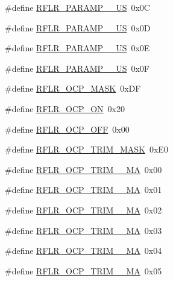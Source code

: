 \begin{DoxyCompactItemize}
\item 
\#define \mbox{\hyperlink{sx1276_regs-_lo_ra_8h_afd5af86b9fcd58b5da08d807ab0deae5}{R\+F\+L\+R\+\_\+\+P\+A\+R\+A\+M\+P\+\_\+\_\+\+US}}~0x0C
\item 
\#define \mbox{\hyperlink{sx1276_regs-_lo_ra_8h_a58992d8a87351616671bb667124c136a}{R\+F\+L\+R\+\_\+\+P\+A\+R\+A\+M\+P\+\_\+\_\+\+US}}~0x0D
\item 
\#define \mbox{\hyperlink{sx1276_regs-_lo_ra_8h_a6af078a4ad16e7e83d180c4470e174e1}{R\+F\+L\+R\+\_\+\+P\+A\+R\+A\+M\+P\+\_\+\_\+\+US}}~0x0E
\item 
\#define \mbox{\hyperlink{sx1276_regs-_lo_ra_8h_a42510cd3823fa579f7ce0a2590414d94}{R\+F\+L\+R\+\_\+\+P\+A\+R\+A\+M\+P\+\_\+\_\+\+US}}~0x0F
\item 
\#define \mbox{\hyperlink{sx1276_regs-_lo_ra_8h_a811d1ea4838fb5bdbc731e246f9abd00}{R\+F\+L\+R\+\_\+\+O\+C\+P\+\_\+\+M\+A\+SK}}~0x\+DF
\item 
\#define \mbox{\hyperlink{sx1276_regs-_lo_ra_8h_ab4cd8bafefd94bf96c0eda92a1a0e2cc}{R\+F\+L\+R\+\_\+\+O\+C\+P\+\_\+\+ON}}~0x20
\item 
\#define \mbox{\hyperlink{sx1276_regs-_lo_ra_8h_add262ca41df12a73f7ab0fe05ca26253}{R\+F\+L\+R\+\_\+\+O\+C\+P\+\_\+\+O\+FF}}~0x00
\item 
\#define \mbox{\hyperlink{sx1276_regs-_lo_ra_8h_a218c5b62787ba2141067b6273f2e43a3}{R\+F\+L\+R\+\_\+\+O\+C\+P\+\_\+\+T\+R\+I\+M\+\_\+\+M\+A\+SK}}~0x\+E0
\item 
\#define \mbox{\hyperlink{sx1276_regs-_lo_ra_8h_a6656289f06f654d070ee51d72830d1cb}{R\+F\+L\+R\+\_\+\+O\+C\+P\+\_\+\+T\+R\+I\+M\+\_\+\_\+\+MA}}~0x00
\item 
\#define \mbox{\hyperlink{sx1276_regs-_lo_ra_8h_a102d3235b329da485a39882b6f06fec4}{R\+F\+L\+R\+\_\+\+O\+C\+P\+\_\+\+T\+R\+I\+M\+\_\+\_\+\+MA}}~0x01
\item 
\#define \mbox{\hyperlink{sx1276_regs-_lo_ra_8h_a916a524ad394506a119ea2c5d8d2642c}{R\+F\+L\+R\+\_\+\+O\+C\+P\+\_\+\+T\+R\+I\+M\+\_\+\_\+\+MA}}~0x02
\item 
\#define \mbox{\hyperlink{sx1276_regs-_lo_ra_8h_a7fc3cb1a990f3c479cf620772593991b}{R\+F\+L\+R\+\_\+\+O\+C\+P\+\_\+\+T\+R\+I\+M\+\_\+\_\+\+MA}}~0x03
\item 
\#define \mbox{\hyperlink{sx1276_regs-_lo_ra_8h_a1d7e9642b9adfb481f9696186a068db8}{R\+F\+L\+R\+\_\+\+O\+C\+P\+\_\+\+T\+R\+I\+M\+\_\+\_\+\+MA}}~0x04
\item 
\#define \mbox{\hyperlink{sx1276_regs-_lo_ra_8h_a08ffd9de8d0ea7320df82bf3ddd38430}{R\+F\+L\+R\+\_\+\+O\+C\+P\+\_\+\+T\+R\+I\+M\+\_\+\_\+\+MA}}~0x05

\end{DoxyCompactItemize}
